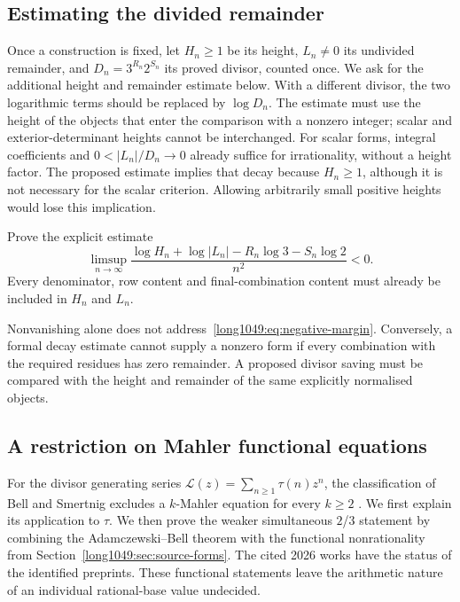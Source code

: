 \subsection{Estimating the divided remainder}

Once a construction is fixed, let $H_n\ge1$ be its height, $L_n\ne0$
its undivided remainder, and $D_n=3^{R_n}2^{S_n}$ its proved divisor,
counted once. We ask for the additional height and remainder estimate
below. With a different divisor, the two logarithmic terms should be
replaced by $\log D_n$. The estimate must use the height of the objects
that enter the comparison with a nonzero integer; scalar and
exterior-determinant heights cannot be interchanged.
For scalar forms, integral coefficients and $0<|L_n|/D_n\to0$
already suffice for irrationality, without a height factor. The
proposed estimate implies that decay because $H_n\ge1$, although it
is not necessary for the scalar criterion. Allowing arbitrarily
small positive heights would lose this implication.

\begin{problem}
Prove the explicit estimate
\begin{equation}
 \limsup_{n\to\infty}
 \frac{\log H_n+\log|L_n|-R_n\log3-S_n\log2}{n^2}<0.
\label{long1049:eq:negative-margin}
\end{equation}
Every denominator, row content and final-combination content must already be
included in $H_n$ and $L_n$.
\end{problem}

Nonvanishing alone does not address~\eqref{long1049:eq:negative-margin}.  Conversely,
a formal decay estimate cannot supply a nonzero form if every
combination with the required residues has zero remainder.  A proposed divisor saving must be compared with the height and remainder
of the same explicitly normalised objects.

\subsection{A restriction on Mahler functional equations}

For the divisor generating series
$\mathcal L(z)=\sum_{n\ge1}\tau(n)z^n$, the classification of Bell and
Smertnig excludes a $k$-Mahler equation for every $k\ge2$
\cite[Thm.~1.3 and the consequences on p.~3]{bellsmertnig2026}.
We first explain its application to $\tau$. We then prove the weaker
simultaneous $2$/$3$ statement by combining the Adamczewski--Bell theorem
with the functional nonrationality from
Section~\ref{long1049:sec:source-forms}.
The cited 2026 works have the status of the identified preprints.
These functional statements leave the arithmetic nature of an
individual rational-base value undecided.

